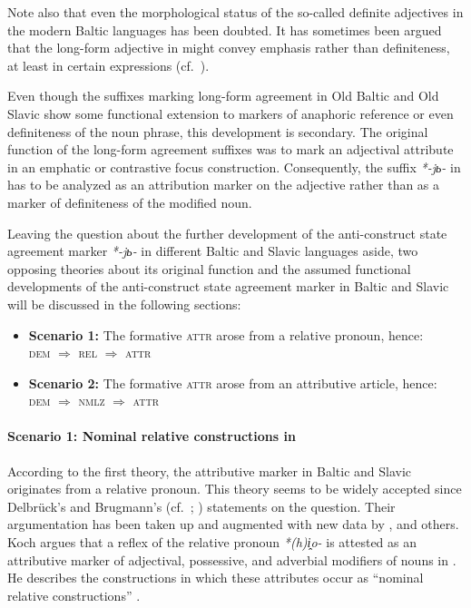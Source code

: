 Note also that even the morphological status of the so-called definite adjectives in the modern Baltic languages has been doubted. It has sometimes been argued that the long-form adjective in  might convey emphasis rather than definiteness, at least in certain expressions (cf.~\citealt[181–182]{kramsky1972}).

Even though the suffixes marking long-form agreement in Old Baltic and Old Slavic show some functional extension to markers of anaphoric reference or even definiteness of the noun phrase, this development is secondary. The original function of the long-form agreement suffixes was to mark an adjectival attribute in an emphatic or contrastive focus construction. Consequently, the suffix \textit{*-jь-} in  has to be analyzed as an attribution marker on the adjective rather than as a marker of definiteness of the modified noun.

Leaving the question about the further development of the anti\hyp{}construct state agreement marker \textit{*-jь-} in different Baltic and Slavic languages aside, two opposing theories about its original function and the assumed functional developments of the anti\hyp{}construct state agreement marker in Baltic and Slavic will be discussed in the following sections:
\begin{itemize}
\item \textbf{Scenario 1:} The formative \textsc{attr} arose from a relative pronoun, hence:\\
\textsc{dem $\Rightarrow$ rel $\Rightarrow$ attr}
\item \textbf{Scenario 2:} The formative \textsc{attr} arose from an attributive article, hence:\\
\textsc{dem $\Rightarrow$ nmlz $\Rightarrow$ attr}
\label{2paths}
\end{itemize}

\paragraph{Scenario 1: Nominal relative constructions in }
According to the first theory, the attributive marker in Baltic and Slavic originates from a relative pronoun. This theory seems to be widely accepted since Delbrück's and Brugmann's (cf.~\citealt[432–433]{delbruck1893}; \citealt[331, 344]{brugmann-etal1916}) statements on the question. Their argumentation has been taken up and augmented with new data by \citet{schmidt1959}, \citet{koch1992,koch1999} and others. Koch argues that a reflex of the  relative pronoun \textit{*(h)i̭o-} is attested as an attributive marker of adjectival, possessive, and adverbial modifiers of nouns in . He describes the constructions in which these attributes occur as “nominal relative constructions” \cite[470, elsewhere]{koch1999}.

